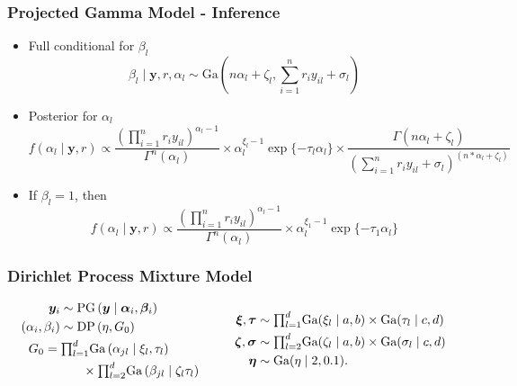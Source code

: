 \documentclass[aspectratio=169]{beamer}
\begin{document}
\begin{frame}
  \frametitle{Projected Gamma Model - Inference}
  \begin{itemize}
    \item Full conditional for $\beta_l$
      \begin{equation*}
        \beta_l\mid \bm{ y}, r, \alpha_l \sim \text{Ga}\left(n\alpha_l + \zeta_l,
                {\textstyle \sum}_{i = 1}^nr_iy_{il} + \sigma_l\right)
      \end{equation*}
    \pause
    \item Posterior for $\alpha_l$
      \begin{equation*}
        f(\alpha_l \mid \bm{ y}, r) \propto
          \frac{\left({\textstyle \prod}_{i = 1}^nr_iy_{il}\right)^{\alpha_l - 1}}{
            \Gamma^n(\alpha_l)} \times \alpha_l^{\xi_l - 1}\exp\{-\tau_l\alpha_l\} \times
            \frac{\Gamma(n\alpha_l + \zeta_l)}{
            \left({\textstyle\sum}_{i = 1}^n r_iy_{il} + \sigma_l
                  \right)^{(n * \alpha_l + \zeta_l)}}
      \end{equation*}
    \pause
    \item If $\beta_l = 1$, then
    \begin{equation*}
      f(\alpha_l \mid \bm{ y}, r) \propto
        \frac{\left({\textstyle\prod}_{i = 1}^n r_iy_{il}\right)^{\alpha_l - 1}}{\Gamma^n(\alpha_l)} \times
        \alpha_l^{\xi_1 - 1}\exp\{-\tau_1\alpha_l\}
    \end{equation*}
  \end{itemize}
\end{frame}

\begin{frame}
  \frametitle{Dirichlet Process Mixture Model}
  \begin{equation*}
    \begin{aligned}
      \bm{ y}_i &\sim \text{PG}\left(\bm{ y}\mid \bm{ \alpha}_i, \bm{ \beta}_i\right)\\
      (\alpha_i,\beta_i) &\sim \text{DP}\left(\eta, G_0\right)\\
      &~\hspace{-1cm}G_0 = {\textstyle\prod}_{l = 1}^d\text{Ga}\left(\alpha_{jl}\mid\xi_{l},\tau_{l}\right)\\
      &~\hspace{0.5cm}\times{\textstyle\prod}_{l=2}^d\text{Ga}\left(\beta_{jl}\mid\zeta_{l}\tau_{l}\right)
    \end{aligned}
    \hspace{1cm}
    \begin{aligned}
      \bm{ \xi},\bm{ \tau} &\sim {\textstyle \prod}_{l = 1}^d \text{Ga}(\xi_l\mid a,b)
              \times \text{Ga}(\tau_l\mid c,d)\\
      \bm{ \zeta},\bm{\sigma} &\sim {\textstyle\prod}_{l = 2}^d\text{Ga}(\zeta_l \mid a,b)
              \times \text{Ga}(\sigma_l\mid c,d)\\
      \bm{ \eta} &\sim \text{Ga}(\eta \mid 2, 0.1).
    \end{aligned}
  \end{equation*}
\end{frame}
\end{document}
